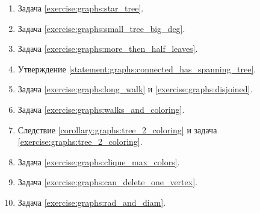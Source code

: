 \begin{enumerate}[label=\textbf{№\arabic*}:]
    \item Задача \ref{exercise:graphs:star_tree}.
    \item Задача \ref{exercise:graphs:small_tree_big_deg}.
    \item Задача \ref{exercise:graphs:more_then_half_leaves}.
    \item Утверждение \ref{statement:graphs:connected_has_spanning_tree}.
    \item Задача \ref{exercise:graphs:long_walk} и \ref{exercise:graphs:disjoined}.
    \item Задача \ref{exercise:graphs:walks_and_coloring}.
    \item Следствие \ref{corollary:graphs:tree_2_coloring} и задача \ref{exercise:graphs:tree_2_coloring}.
    \item Задача \ref{exercise:graphs:clique_max_colors}.
    \item Задача \ref{exercise:graphs:can_delete_one_vertex}.
    \item Задача \ref{exercise:graphs:rad_and_diam}.
\end{enumerate}

